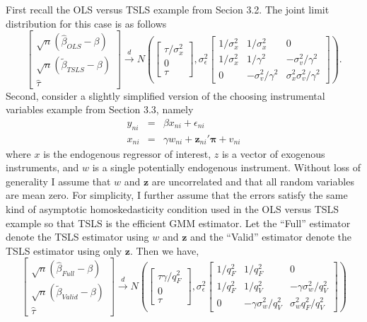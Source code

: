 \documentclass[12pt,letterpaper]{article}
\begin{document}
First recall the OLS versus TSLS example from Secion 3.2.
The joint limit distribution for this case is as follows
\begin{equation*}
  \left[ 
  \begin{array}{c}
    \sqrt{n} \left( \widehat{\beta}_{OLS} - \beta \right)\\
    \sqrt{n} \left( \widetilde{\beta}_{TSLS} - \beta \right)\\
    \widehat{\tau}
\end{array}
\right] \overset{d}{\rightarrow} N\left( \left[
\begin{array}{c}
  \tau/\sigma_x^2 \\ 0 \\ \tau
\end{array}
\right], \sigma_{\epsilon}^2 
\left[
\begin{array}{ccc}
  1/\sigma_x^2 & 1/\sigma_x^2 & 0\\
  1/\sigma_x^2 & 1/\gamma^2 & -\sigma_v^2/\gamma^2\\
  0 & -\sigma_v^2/\gamma^2 & \sigma_x^2 \sigma_v^2/\gamma^2
\end{array}
\right]\right).
\end{equation*}
Second, consider a slightly simplified version of the choosing instrumental variables example from Section 3.3, namely
\begin{eqnarray*}
  y_{ni} &=& \beta x_{ni} + \epsilon_{ni}\\
  x_{ni} &=& \gamma w_{ni} + \mathbf{z}_{ni}' \boldsymbol{\pi} + v_{ni}
\end{eqnarray*}
where $x$ is the endogenous regressor of interest, $z$ is a vector of exogenous instruments, and $w$ is a single potentially endogenous instrument.
Without loss of generality I assume that $w$ and $\mathbf{z}$ are uncorrelated and that all random variables are mean zero.
For simplicity, I further assume that the errors satisfy the same kind of asymptotic homoskedasticity condition used in the OLS versus TSLS example so that TSLS is the efficient GMM estimator.
Let the ``Full'' estimator denote the TSLS estimator using $w$ and $\mathbf{z}$ and the ``Valid'' estimator denote the TSLS estimator using only $\mathbf{z}$.
Then we have,
\begin{equation*}
  \left[ 
  \begin{array}{c}
    \sqrt{n} \left( \widehat{\beta}_{Full} - \beta \right)\\
    \sqrt{n} \left( \widetilde{\beta}_{Valid} - \beta \right)\\
    \widehat{\tau}
\end{array}
\right] \overset{d}{\rightarrow} N\left( \left[
\begin{array}{c}
  \tau\gamma/q^2_{F} \\ 0 \\ \tau
\end{array}
\right], \sigma_{\epsilon}^2 
\left[
\begin{array}{ccc}
  1/q_{F}^2 & 1/q_{F}^2 & 0\\
  1/q_{F}^2 & 1/q_{V}^2 & -\gamma\sigma_w^2/q^2_{V}\\ 
  0 & -\gamma\sigma_w^2/q^2_{V} & \sigma_w^2 q^2_{F}/q^2_{V}
\end{array}
\right]\right)
\end{equation*}
\end{document}
